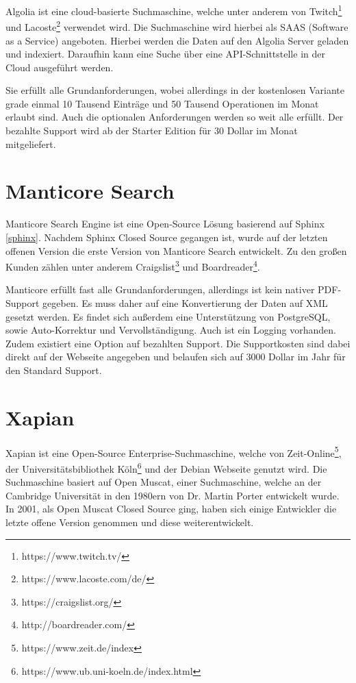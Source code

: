 Algolia ist eine cloud-basierte Suchmaschine, welche unter anderem von Twitch\footnote{https://www.twitch.tv/} und Lacoste\footnote{https://www.lacoste.com/de/} verwendet wird. Die Suchmaschine wird hierbei als SAAS (Software as a Service) angeboten. Hierbei werden die Daten auf den Algolia Server geladen und indexiert. Daraufhin kann eine Suche über eine API-Schnittstelle in der Cloud ausgeführt werden.

Sie erfüllt alle Grundanforderungen, wobei allerdings in der kostenlosen Variante grade einmal 10 Tausend Einträge und 50 Tausend Operationen im Monat erlaubt sind. Auch die optionalen Anforderungen werden so weit alle erfüllt. Der bezahlte Support wird ab der Starter Edition für 30 Dollar im Monat mitgeliefert. \cite{Algolia.2019}

\section{Manticore Search}
\label{manticore}

Manticore Search Engine ist eine Open-Source Lösung basierend auf Sphinx \ref{sphinx}. Nachdem Sphinx Closed Source gegangen ist, wurde auf der letzten offenen Version die erste Version von Manticore Search entwickelt. Zu den großen Kunden zählen unter anderem Craigslist\footnote{https://craigslist.org/} und Boardreader\footnote{http://boardreader.com/}.

Manticore erfüllt fast alle Grundanforderungen, allerdings ist kein nativer PDF-Support gegeben. Es muss daher auf eine Konvertierung der Daten auf XML gesetzt werden. Es findet sich außerdem eine Unterstützung von PostgreSQL, sowie Auto-Korrektur und Vervollständigung. Auch ist ein Logging vorhanden. Zudem existiert eine Option auf bezahlten Support. Die Supportkosten sind dabei direkt auf der Webseite angegeben und belaufen sich auf 3000 Dollar im Jahr für den Standard Support. \cite{ManticoreSoftwareLtd.2019}

\section{Xapian}
\label{xapian}

Xapian ist eine Open-Source Enterprise-Suchmaschine, welche von Zeit-Online\footnote{https://www.zeit.de/index}, der Universitätsbibliothek Köln\footnote{https://www.ub.uni-koeln.de/index.html} und der Debian Webseite genutzt wird. Die Suchmaschine basiert auf Open Muscat, einer Suchmaschine, welche an der Cambridge Universität in den 1980ern von Dr. Martin Porter entwickelt wurde. In 2001, als Open Muscat Closed Source ging, haben sich einige Entwickler die letzte offene Version genommen und diese weiterentwickelt.

